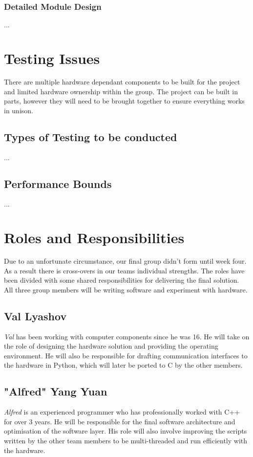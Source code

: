 \documentclass[11pt,a4paper,titlepage]{report}
\begin{document}
\subsubsection{Detailed Module Design}

...


\section{Testing Issues}

There are multiple hardware dependant components to be built for the project and limited hardware ownership within the group. The project can be built in parts, however they will need to be brought together to ensure everything works in unison. 

\subsection{Types of Testing to be conducted}

...

\subsection{Performance Bounds}

...




\section{Roles and Responsibilities}

Due to an unfortunate circumstance, our final group didn't form until week four. As a result there is cross-overs in our teams individual strengths. The roles have been divided with some shared responsibilities for delivering the final solution. All three group members will be writing software and experiment with hardware.


\subsection{Val Lyashov}
\textit{Val} has been working with computer components since he was 16. He will take on the role of designing the hardware solution and providing the operating environment. He will also be responsible for drafting communication interfaces to the hardware in Python, which will later be ported to C by the other members.


\subsection{"Alfred" Yang Yuan}
\textit{Alfred} is an experienced programmer who has professionally worked with C++ for over 3 years. He will be responsible for the final software architecture and optimisation of the software layer. His role will also involve improving the scripts written by the other team members to be multi-threaded and run efficiently with the hardware.
\end{document}

